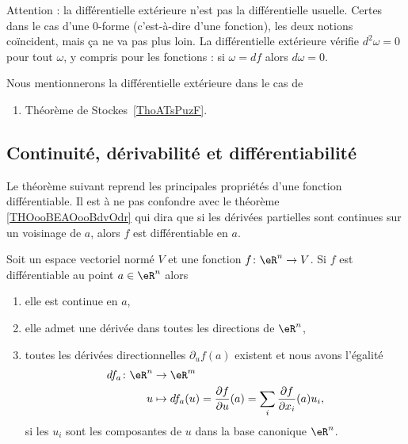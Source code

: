 Attention : la différentielle extérieure n'est pas la différentielle usuelle. Certes dans le cas d'une \( 0\)-forme (c'est-à-dire d'une fonction), les deux notions coïncident, mais ça ne va pas plus loin. La différentielle extérieure vérifie \( d^2\omega=0\) pour tout \( \omega\), y compris pour les fonctions : si \( \omega=df\) alors \( d\omega=0\).



Nous mentionnerons la différentielle extérieure dans le cas de
\begin{enumerate}
	\item
	      Théorème de Stockes~\ref{ThoATsPuzF}.
\end{enumerate}

\subsection{Continuité, dérivabilité et différentiabilité}

Le théorème suivant reprend les principales propriétés d'une fonction différentiable. Il est à ne pas confondre avec le théorème \ref{THOooBEAOooBdvOdr} qui dira que si les dérivées partielles sont continues sur un voisinage de \( a\), alors \( f\) est différentiable en \( a\).
\begin{proposition}\label{diff1}\label{ThoRapPropDiffSi}
	Soit un espace vectoriel normé \( V\) et une fonction \( f\colon \eR^n\to V\). Si \( f\) est différentiable au point \( a\in \eR^n\) alors
	\begin{enumerate}
		\item
		      elle est continue en \( a\),
		\item
		      elle admet une dérivée dans toutes les directions de \( \eR^n\),
		\item  toutes les dérivées directionnelles \( \partial_uf(a)\) existent et nous avons l'égalité
		      \begin{equation}        \label{EqDiffPartRap}
			      \begin{aligned}
				      df_a\colon \eR^n & \to \eR^m                                                                                              \\
				      u                & \mapsto df_a(u)=\frac{ \partial f }{ \partial u }(a)=\sum_i \frac{ \partial f }{ \partial x_i }(a)u_i,
			      \end{aligned}
		      \end{equation}
		      si les \( u_i\) sont les composantes de \( u\) dans la base canonique \( \eR^n\).
	\end{enumerate}
\end{proposition}

